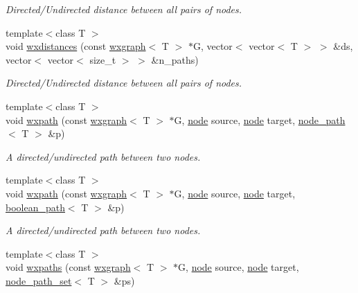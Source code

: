 \begin{DoxyCompactItemize}
\begin{DoxyCompactList}\small\item\em Directed/\+Undirected distance between all pairs of nodes. \end{DoxyCompactList}\item 
{\footnotesize template$<$class T $>$ }\\void \hyperlink{namespacelgraph_1_1traversal_a793eff57b1bb9b9a43fe7de0da68c7c9}{wxdistances} (const \hyperlink{classlgraph_1_1utils_1_1wxgraph}{wxgraph}$<$ T $>$ $\ast$G, vector$<$ vector$<$ T $>$ $>$ \&ds, vector$<$ vector$<$ size\+\_\+t $>$ $>$ \&n\+\_\+paths)
\begin{DoxyCompactList}\small\item\em Directed/\+Undirected distance between all pairs of nodes. \end{DoxyCompactList}\item 
{\footnotesize template$<$class T $>$ }\\void \hyperlink{namespacelgraph_1_1traversal_acb255be04a53f1d3863f7beaeda2dde0}{wxpath} (const \hyperlink{classlgraph_1_1utils_1_1wxgraph}{wxgraph}$<$ T $>$ $\ast$G, \hyperlink{namespacelgraph_1_1utils_ab9c6b34241f0b68372c55f34c460e863}{node} source, \hyperlink{namespacelgraph_1_1utils_ab9c6b34241f0b68372c55f34c460e863}{node} target, \hyperlink{classlgraph_1_1utils_1_1node__path}{node\+\_\+path}$<$ T $>$ \&p)
\begin{DoxyCompactList}\small\item\em A directed/undirected path between two nodes. \end{DoxyCompactList}\item 
{\footnotesize template$<$class T $>$ }\\void \hyperlink{namespacelgraph_1_1traversal_a2e3286cb7b83c0a47820b1d7256231ab}{wxpath} (const \hyperlink{classlgraph_1_1utils_1_1wxgraph}{wxgraph}$<$ T $>$ $\ast$G, \hyperlink{namespacelgraph_1_1utils_ab9c6b34241f0b68372c55f34c460e863}{node} source, \hyperlink{namespacelgraph_1_1utils_ab9c6b34241f0b68372c55f34c460e863}{node} target, \hyperlink{classlgraph_1_1utils_1_1boolean__path}{boolean\+\_\+path}$<$ T $>$ \&p)
\begin{DoxyCompactList}\small\item\em A directed/undirected path between two nodes. \end{DoxyCompactList}\item 
{\footnotesize template$<$class T $>$ }\\void \hyperlink{namespacelgraph_1_1traversal_a97b92a041fa93b26f26d60d11f717dc5}{wxpaths} (const \hyperlink{classlgraph_1_1utils_1_1wxgraph}{wxgraph}$<$ T $>$ $\ast$G, \hyperlink{namespacelgraph_1_1utils_ab9c6b34241f0b68372c55f34c460e863}{node} source, \hyperlink{namespacelgraph_1_1utils_ab9c6b34241f0b68372c55f34c460e863}{node} target, \hyperlink{namespacelgraph_1_1utils_a723c115f9865edfab11a90377b9abef4}{node\+\_\+path\+\_\+set}$<$ T $>$ \&ps)

\end{DoxyCompactItemize}
